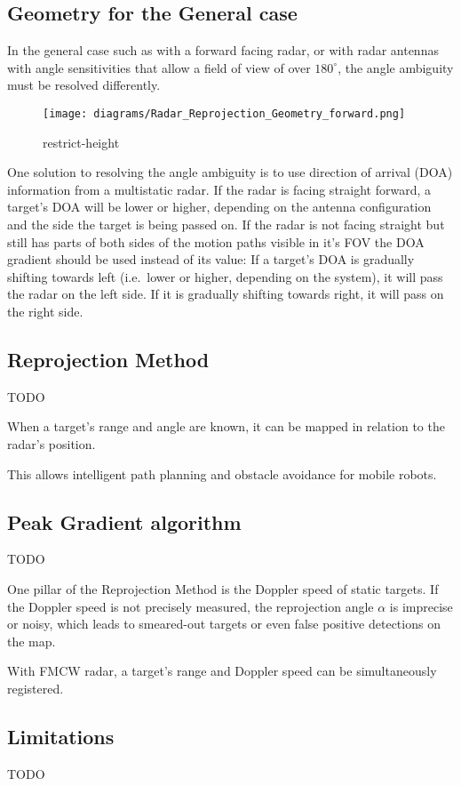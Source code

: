 \subsection{Geometry for the General
case}\label{geometry-for-the-general-case}

In the general case such as with a forward facing radar, or with radar
antennas with angle sensitivities that allow a field of view of over
\(180^\circ\), the angle ambiguity must be resolved differently.

\begin{figure}
\centering
\texttt{[image: diagrams/Radar\_Reprojection\_Geometry\_forward.png]}
\caption{restrict-height}
\end{figure}

One solution to resolving the angle ambiguity is to use direction of
arrival (DOA) information from a multistatic radar. If the radar is
facing straight forward, a target's DOA will be lower or higher,
depending on the antenna configuration and the side the target is being
passed on. If the radar is not facing straight but still has parts of
both sides of the motion paths visible in it's FOV the DOA gradient
should be used instead of its value: If a target's DOA is gradually
shifting towards left (i.e.~lower or higher, depending on the system),
it will pass the radar on the left side. If it is gradually shifting
towards right, it will pass on the right side.

\subsection{Reprojection Method}\label{reprojection-method}

TODO

When a target's range and angle are known, it can be mapped in relation
to the radar's position.

This allows intelligent path planning and obstacle avoidance for mobile
robots.



\subsection{Peak Gradient algorithm}\label{peak-gradient-algorithm}

TODO

One pillar of the Reprojection Method is the Doppler speed of static
targets. If the Doppler speed is not precisely measured, the
reprojection angle \(\alpha\) is imprecise or noisy, which leads to
smeared-out targets or even false positive detections on the map.

With FMCW radar, a target's range and Doppler speed can be
simultaneously registered.

\subsection{Limitations}\label{limitations}


TODO
